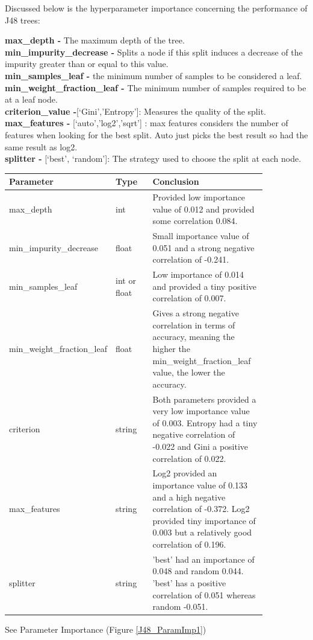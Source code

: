 \documentclass[11pt]{article}
\begin{document}
Discussed below is the hyperparameter \cite{SklearnTreeDecisionTreeClassifier} importance concerning the performance of J48 trees:

\textbf{max\_depth -} The maximum depth of the tree. \\
\textbf{min\_impurity\_decrease -} Splits a node if this split induces a decrease of the impurity greater than or equal to this value. \\
\textbf{min\_samples\_leaf -} the minimum number of samples to be considered a leaf. \\
\textbf{min\_weight\_fraction\_leaf -} The minimum number of samples required to be at a leaf node. \\
\textbf{criterion\_value -}[‘Gini’,’Entropy’]: Measures the quality of the split.
\textbf{max\_features -} [‘auto’,’log2’,’sqrt’] : max features considers the number of features when looking for the best split. Auto just picks the best result so had the same result as log2. \\
\textbf{splitter -} [‘best’, ‘random’]: The strategy used to choose the split at each node. 
\newline

\begin{table}[h]
  \centering
  \begin{tabular}{|p{0.25\linewidth} | p{0.15 \linewidth} | p{0.45\linewidth}|} 
    \hline
    \textbf{Parameter}  & \textbf{Type} &\textbf{Conclusion} \\ \hline
    max\_depth & int & Provided low importance value of 0.012 and provided some correlation 0.084. \\ \hline
    min\_impurity\_decrease & float & Small importance value of 0.051 and a strong negative correlation of -0.241.  \\ \hline
    min\_samples\_leaf & int or float & Low importance of 0.014 and provided a tiny positive correlation of 0.007. \\ \hline
    min\_weight\_fraction\_leaf & float & Gives a strong negative correlation in terms of accuracy, meaning the higher the min\_weight\_fraction\_leaf value, the lower the accuracy.\\ \hline
    criterion & string & Both parameters provided a very low importance value of 0.003. Entropy had a tiny negative correlation of -0.022 and Gini a positive correlation of 0.022. \\ \hline
    max\_features & string & Log2 provided an importance value of 0.133 and a high negative correlation of -0.372. Log2 provided tiny importance of 0.003 but a relatively good correlation of 0.196. \\ \hline
    splitter & string & 'best' had an importance of 0.048 and random 0.044. 'best' has a positive correlation of 0.051 whereas random -0.051. \\ \hline
  \end{tabular}
\end{table}\label{RF_Analysis_Table}
See Parameter Importance (Figure \ref{J48_ParamImp1})
\FloatBarrier
\end{document}
